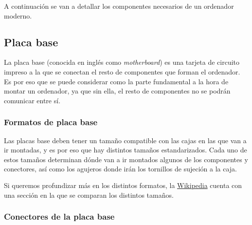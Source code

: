 A continuación se van a detallar los componentes necesarios de un ordenador moderno.


\subsection{Placa base}

La placa base (conocida en inglés como \textit{motherboard}) es una tarjeta de circuito impreso a la que se conectan el resto de componentes que forman el ordenador. Es por eso que se puede considerar como la parte fundamental a la hora de montar un ordenador, ya que sin ella, el resto de componentes no se podrán comunicar entre sí.


\subsubsection{Formatos de placa base}
Las placas base deben tener un tamaño compatible con las cajas en las que van a ir montadas, y es por eso que hay distintos tamaños estandarizados. Cada uno de estos tamaños determinan dónde van a ir montados algunos de los componentes y conectores, así como los agujeros donde irán los tornillos de sujeción a la caja.

Si queremos profundizar más en los distintos formatos, la \href{https://es.wikipedia.org/wiki/Placa_base#Formatos_de_placa_base}{Wikipedia} cuenta con una sección en la que se comparan los distintos tamaños.


\subsubsection{Conectores de la placa base}

